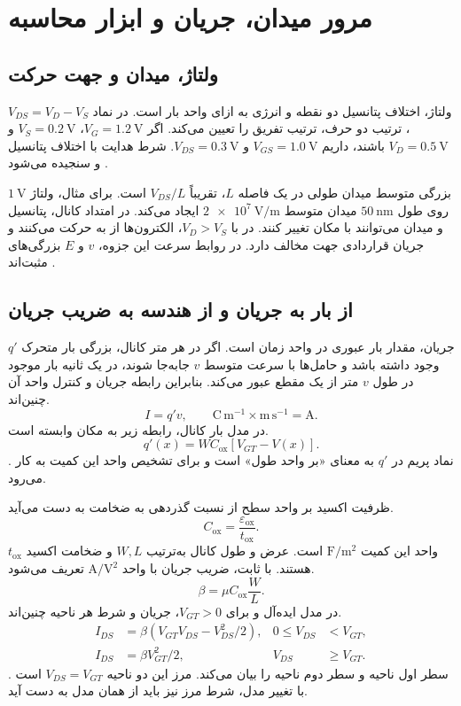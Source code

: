 \chapter*{مرور میدان، جریان و ابزار محاسبه}
\section*{ولتاژ، میدان و جهت حرکت}
ولتاژ، اختلاف پتانسیل دو نقطه و انرژی به ازای واحد بار است. در نماد
\(V_{DS}=V_D-V_S\)، ترتیب دو حرف، ترتیب تفریق را تعیین می‌کند. اگر
\(V_G=\qty{1.2}{\volt}\)، \(V_S=\qty{0.2}{\volt}\) و
\(V_D=\qty{0.5}{\volt}\) باشند، داریم \(V_{GS}=\qty{1.0}{\volt}\) و
\(V_{DS}=\qty{0.3}{\volt}\). شرط هدایت با اختلاف پتانسیل  و
 سنجیده می‌شود \cite[بخش ]{weste}.

بزرگی متوسط میدان طولی در یک فاصله \(L\)، تقریباً \(V_{DS}/L\) است.
برای مثال، ولتاژ \(\qty{1}{\volt}\) روی طول \(\qty{50}{\nano\metre}\)
میدان متوسط \(\qty{2e7}{\volt\per\metre}\) ایجاد می‌کند. در امتداد کانال،
پتانسیل و میدان می‌توانند با مکان تغییر کنند. در  با \(V_D>V_S\)،
الکترون‌ها از  به  حرکت می‌کنند و جریان قراردادی جهت
مخالف دارد. در روابط سرعت این جزوه، \(v\) و \(E\) بزرگی‌های مثبت‌اند
\cite[بخش‌های  و ]{weste}.

\section*{از بار به جریان و از هندسه به ضریب جریان}
جریان، مقدار بار عبوری در واحد زمان است. اگر در هر متر کانال، بزرگی بار
متحرک \(q'\) وجود داشته باشد و حامل‌ها با سرعت متوسط \(v\) جابه‌جا شوند،
در یک ثانیه بار موجود در طول \(v\) متر از یک مقطع عبور می‌کند. بنابراین
رابطه جریان و کنترل واحد آن چنین‌اند.
\[
 I=q'v,\qquad
 \mathrm{C\,m^{-1}}\times\mathrm{m\,s^{-1}}=\mathrm{A}.
\]
در مدل بار کانال، رابطه زیر به مکان وابسته است.
\[
 q'(x)=WC_{\mathrm{ox}}[V_{GT}-V(x)].
\]
\cite[بخش ]{weste}. نماد پریم در \(q'\) به معنای «بر واحد طول»
است و برای تشخیص واحد این کمیت به کار می‌رود.

ظرفیت اکسید بر واحد سطح از نسبت گذردهی به ضخامت به دست می‌آید.
\[
 C_{\mathrm{ox}}=\frac{\varepsilon_{\mathrm{ox}}}{t_{\mathrm{ox}}}.
\]
واحد این کمیت \(\unit{\farad\per\metre\squared}\) است. عرض و طول کانال به‌ترتیب
\(W,L\) و ضخامت اکسید \(t_{\mathrm{ox}}\) هستند. با  ثابت،
ضریب جریان با واحد \(\unit{\ampere\per\volt\squared}\) تعریف می‌شود.
\[
 \beta=\mu C_{\mathrm{ox}}\frac{W}{L}.
\]
در مدل ایده‌آل و برای \(V_{GT}>0\)، جریان و شرط هر ناحیه چنین‌اند.
\[
 \begin{aligned}
 I_{DS}&=\beta(V_{GT}V_{DS}-V_{DS}^2/2),
 &0\le V_{DS}&<V_{GT},\\
 I_{DS}&=\beta V_{GT}^2/2,
 &V_{DS}&\ge V_{GT}.
 \end{aligned}
\]
سطر اول ناحیه  و سطر دوم ناحیه  را بیان می‌کند.
مرز این دو ناحیه \(V_{DS}=V_{GT}\) است
\cite[رابطه ]{weste}. با تغییر مدل، شرط مرز نیز باید از همان
مدل به دست آید.

